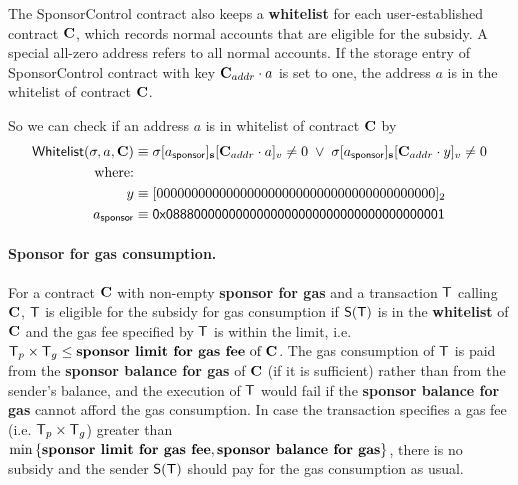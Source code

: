 The SponsorControl contract also keeps a {\bf whitelist} for each user-established contract $\mathbf{C}$, which records normal accounts that are eligible for the subsidy. A special all-zero address refers to all normal accounts. If the storage entry of SponsorControl contract with key $\mathbf{C}_{addr}\cdot a$ is set to one, the address $a$ is in the whitelist of contract $\mathbf{C}$.

So we can check if an address $a$ is in whitelist of contract $\mathbf{C}$ by
\begin{align}
	\mathsf{Whitelist}(\mathbf{\sigma},a,\mathbf{C}) &\equiv \mathbf{\sigma}[a_{\sf sponsor}]_{\bf s}[\mathbf{C}_{addr}\cdot a]_v \neq 0 \;\vee\; \mathbf{\sigma}[a_{\sf sponsor}]_{\bf s}[\mathbf{C}_{addr}\cdot y]_v \neq 0 \notag \\
	\mbox{where:}&\notag \\
	y&\equiv [0000000000000000000000000000000000000000]_2 \notag \\ 
	a_{\sf sponsor} & \equiv {\sf 0x0888000000000000000000000000000000000001} \label{eq:whitelist}
\end{align}




\paragraph{Sponsor for gas consumption.}
For a contract $\mathbf{C}$ with non-empty {\bf sponsor for gas} and a transaction $\textsf{T}$ calling $\mathbf{C}$, 
$\textsf{T}$ is eligible for the subsidy for gas consumption 
if $\mathsf{S} (\textsf{T})$ is in the \textbf{whitelist} of $\mathbf{C}$
and the gas fee specified by $\textsf{T}$ is within the limit, i.e. $\textsf{T}_p\times\textsf{T}_g \le \text{\textbf{sponsor limit for gas fee} of $\mathbf{C}$}$.
The gas consumption of $\textsf{T}$ is paid from the \textbf{sponsor balance for gas} of $\mathbf{C}$ (if it is sufficient) rather than from the sender's balance,
and the execution of $\textsf{T}$ would fail if the \textbf{sponsor balance for gas} cannot afford the gas consumption.
In case the transaction specifies a gas fee (i.e. $\textsf{T}_p\times\textsf{T}_g$) greater than $\min{\left \{{\textbf{sponsor limit for gas fee}, \textbf{sponsor balance for gas}} \right \}}$, there is no subsidy and the sender $\mathsf{S}{\left({\textsf{T}} \right)}$ should pay for the gas consumption as usual.

